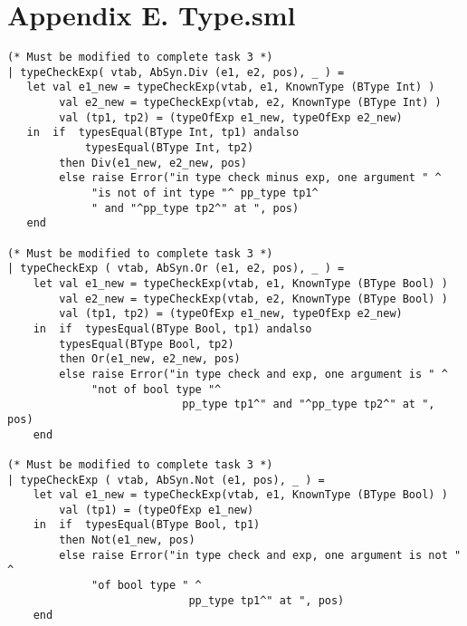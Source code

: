\documentclass[12pt,a4paper,english]{article}
\begin{document}
\newpage
\section{Appendix E. Type.sml}

\begin{lstlisting}[caption=Changes made in type.sml for task 2 and task 3.]
(* Must be modified to complete task 3 *)
| typeCheckExp( vtab, AbSyn.Div (e1, e2, pos), _ ) =
   let val e1_new = typeCheckExp(vtab, e1, KnownType (BType Int) )
        val e2_new = typeCheckExp(vtab, e2, KnownType (BType Int) )
        val (tp1, tp2) = (typeOfExp e1_new, typeOfExp e2_new)
   in  if  typesEqual(BType Int, tp1) andalso 
            typesEqual(BType Int, tp2)
        then Div(e1_new, e2_new, pos)
        else raise Error("in type check minus exp, one argument " ^
			 "is not of int type "^ pp_type tp1^
			 " and "^pp_type tp2^" at ", pos)
   end

(* Must be modified to complete task 3 *)
| typeCheckExp ( vtab, AbSyn.Or (e1, e2, pos), _ ) =
    let val e1_new = typeCheckExp(vtab, e1, KnownType (BType Bool) )
        val e2_new = typeCheckExp(vtab, e2, KnownType (BType Bool) )
        val (tp1, tp2) = (typeOfExp e1_new, typeOfExp e2_new)
    in  if  typesEqual(BType Bool, tp1) andalso 
	    typesEqual(BType Bool, tp2)
        then Or(e1_new, e2_new, pos)
        else raise Error("in type check and exp, one argument is " ^ 
			 "not of bool type "^
                           pp_type tp1^" and "^pp_type tp2^" at ", pos)
    end    

(* Must be modified to complete task 3 *)
| typeCheckExp ( vtab, AbSyn.Not (e1, pos), _ ) =
    let val e1_new = typeCheckExp(vtab, e1, KnownType (BType Bool) )
        val (tp1) = (typeOfExp e1_new)
    in  if  typesEqual(BType Bool, tp1)
        then Not(e1_new, pos)
        else raise Error("in type check and exp, one argument is not " ^
			 "of bool type " ^
                            pp_type tp1^" at ", pos)
    end   
\end{lstlisting}
\end{document}
